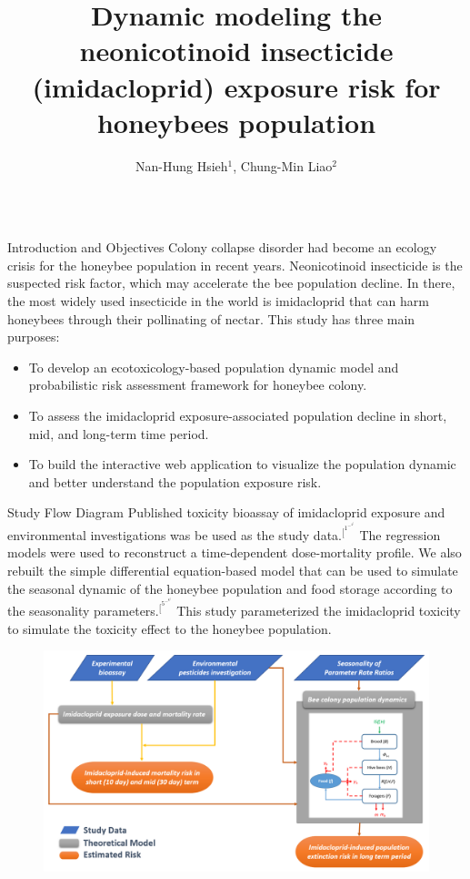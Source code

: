 \documentclass[final,t]{beamer}
\title{Dynamic modeling the neonicotinoid insecticide (imidacloprid) exposure risk for honeybees population}
\author[1]{Nan-Hung Hsieh$^1$, Chung-Min Liao$^2$}
\institute[1]{$^1$Department of Veterinary Integrative Biosciences, Texas \& University, College Station, TX\\
$^2$Department of Bioenvironmental Systems Engineering, National Taiwan University, Taipei, Taiwan}
\begin{document}


\begin{frame}[fragile]
  \begin{columns}[t]

    \begin{column}{0.19\linewidth}
      \begin{block}{Introduction and Objectives}
Colony collapse disorder had become an ecology crisis for the honeybee population in recent years. Neonicotinoid insecticide is the suspected risk factor, which may accelerate the bee population decline. In there, the most widely used insecticide in the world is imidacloprid that can harm honeybees through their pollinating of nectar. This study has three main purposes:
        \begin{itemize}
          \item To develop an ecotoxicology-based population dynamic model and probabilistic risk assessment framework for honeybee colony.
          \item To assess the imidacloprid exposure-associated population decline in short, mid, and long-term time period. 
          \item To build the interactive web application to visualize the population dynamic and better understand the population exposure risk.
        \end{itemize}
      \end{block}
      
      \begin{block}{Study Flow Diagram}
Published toxicity bioassay of imidacloprid exposure and environmental investigations was be used as the study data.$^[^1^-^4^]$ The regression models were used to reconstruct a time-dependent dose-mortality profile. We also rebuilt the simple differential equation-based model that can be used to simulate the seasonal dynamic of the honeybee population and food storage according to the seasonality parameters.$^[^5^-^8^]$ This study parameterized the imidacloprid toxicity to simulate the toxicity effect to the honeybee population. 
      \begin{figure}[htb]
\includegraphics[width=.9\columnwidth]{flowchart.png}
\end{figure}
    \end{block}
    

\end{column}
\end{columns}
\end{frame}
\end{document}
